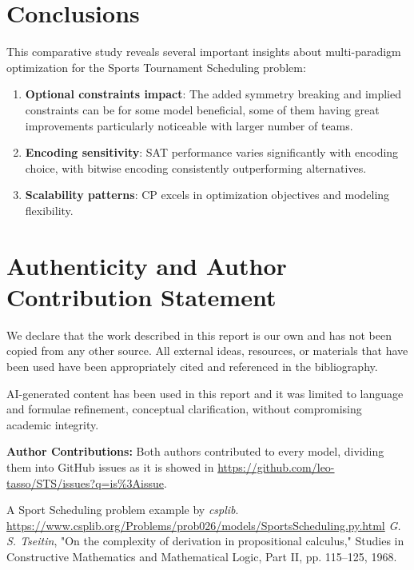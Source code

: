 \documentclass[11pt]{article}
\begin{document}
\section{Conclusions}

This comparative study reveals several important insights about multi-paradigm optimization for the Sports Tournament Scheduling problem:

\begin{enumerate}    
    \item \textbf{Optional constraints impact}: The added symmetry breaking and implied constraints can be for some model beneficial, some of them having great improvements particularly noticeable with larger number of teams.
    
    \item \textbf{Encoding sensitivity}: SAT performance varies significantly with encoding choice, with bitwise encoding consistently outperforming alternatives.
    
    \item \textbf{Scalability patterns}: CP excels in optimization objectives and modeling flexibility.
\end{enumerate}

\newpage
\section*{Authenticity and Author Contribution Statement}

We declare that the work described in this report is our own and has not been copied from any other source. All external ideas, resources, or materials that have been used have been appropriately cited and referenced in the bibliography.

AI-generated content has been used in this report and it was limited to language and formulae refinement, conceptual clarification, without compromising academic integrity.

\noindent \textbf{Author Contributions:}
Both authors contributed to every model, dividing them into GitHub issues as it is showed in \url{https://github.com/leo-tasso/STS/issues?q=is%3Aissue}.



\begin{thebibliography}{99}

A Sport Scheduling problem example by \textit{csplib}.\\
\url{https://www.csplib.org/Problems/prob026/models/SportsScheduling.py.html}
\textit{G. S. Tseitin}, "On the complexity of derivation in propositional calculus," Studies in Constructive Mathematics and Mathematical Logic, Part II, pp. 115–125, 1968.

\end{thebibliography}
\end{document}
